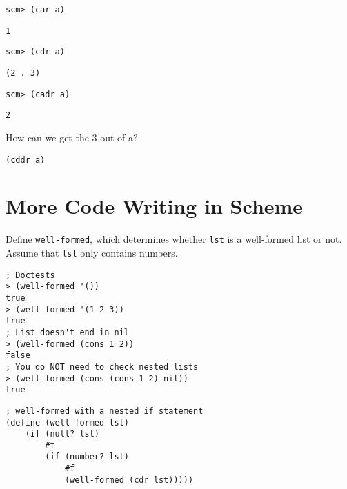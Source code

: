 \documentclass{exam}
\begin{document}
\begin{questions}
\begin{blocksection}
\begin{lstlisting}
scm> (car a)
\end{lstlisting}
\begin{solution}[.25in]
\begin{lstlisting}
1
\end{lstlisting}
\end{solution}

\begin{lstlisting}
scm> (cdr a)
\end{lstlisting}
\begin{solution}[.25in]
\begin{lstlisting}
(2 . 3)
\end{lstlisting}
\end{solution}

\begin{lstlisting}
scm> (cadr a)
\end{lstlisting}
\begin{solution}[.25in]
\begin{lstlisting}
2
\end{lstlisting}
\end{solution}

How can we get the 3 out of a?
\begin{solution}[.25in]
\begin{lstlisting}
(cddr a)
\end{lstlisting}
\end{solution}
\end{blocksection}

\section{More Code Writing in Scheme}

\begin{blocksection}
\question Define \texttt{well-formed}, which determines whether \texttt{lst} is a well-formed list or not. Assume that \texttt{lst} only contains numbers.

\begin{lstlisting}
; Doctests
> (well-formed '())
true
> (well-formed '(1 2 3))
true
; List doesn't end in nil
> (well-formed (cons 1 2))
false
; You do NOT need to check nested lists
> (well-formed (cons (cons 1 2) nil))
true
\end{lstlisting}

\begin{solution}[0.75in]
\begin{lstlisting}
; well-formed with a nested if statement
(define (well-formed lst)
    (if (null? lst)
        #t
        (if (number? lst)
            #f
            (well-formed (cdr lst)))))


\end{lstlisting}
\end{solution}
\end{blocksection}
\end{questions}
\end{document}
